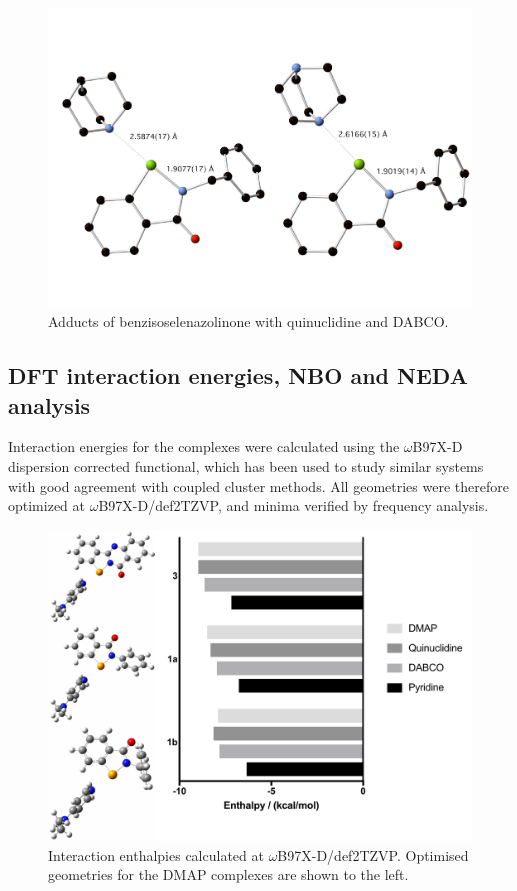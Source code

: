 \begin{refsection}
\begin{figure}
  \centering
  \includegraphics[width=0.8\linewidth]{Figures/benzyl-quin-dabco-xray.pdf}
  \caption{Adducts of benzisoselenazolinone  with quinuclidine and DABCO.}
  \label{fig:benzyl-adducts}
\end{figure}

\subsection{DFT interaction energies, NBO and NEDA analysis}
Interaction energies for the complexes were calculated using the $\omega$B97X-D dispersion corrected functional, which has been used to study similar systems with good agreement with coupled cluster methods.\autocite{Oliveira2017}
All geometries were therefore optimized at $\omega$B97X-D/def2TZVP, and minima verified by frequency analysis.

\begin{figure}
  \centering
  \includegraphics[width=0.8\linewidth]{Figures/dft-energies.pdf}
  \caption[Interaction energies for various complexes.]{Interaction enthalpies calculated at $\omega$B97X-D/def2TZVP. Optimised geometries for the DMAP complexes are shown to the left.}
\end{figure}


\end{refsection}
